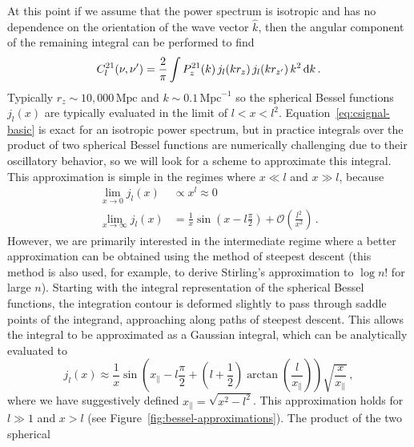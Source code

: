 \begin{bibunit}
\begin{subappendices}
At this point if we assume that the power spectrum is isotropic and has no dependence on the
orientation of the wave vector $\hat k$, then the angular component of the remaining integral can be
performed to find
\begin{equation}\label{eq:csignal-basic}
    C^{21}_l(\nu, \nu^\prime) =
        \frac{2}{\pi}
        \int
        P_z^{21}(k) \,
        j_l(k r_z) \,
        j_l(k r_{z^\prime}) \,
        k^2 \, {\textrm d} k\,.
\end{equation}
Typically $r_z\sim 10,000\,\text{Mpc}$ and $k\sim 0.1\,\text{Mpc}^{-1}$ so the spherical Bessel
functions $j_l(x)$ are typically evaluated in the limit of $l < x < l^2$.
Equation~\ref{eq:csignal-basic} is exact for an isotropic power spectrum, but in practice integrals
over the product of two spherical Bessel functions are numerically challenging due to their
oscillatory behavior, so we will look for a scheme to approximate this integral.  This approximation
is simple in the regimes where $x \ll l$ and $x \gg l$, because
\begin{align}
    \lim_{x\rightarrow 0} j_l(x) &\propto x^l \approx 0 \\
    \lim_{x\rightarrow\infty} j_l(x) &=
        \frac{1}{x} \sin\left(x - l\frac{\pi}{2}\right)
        + \mathcal{O}\left(\frac{l^2}{x^2}\right)
    \,.
\end{align}
However, we are primarily interested in the intermediate regime where a better approximation can be
obtained using the method of steepest descent (this method is also used, for example, to derive
Stirling's approximation to $\log n!$ for large $n$). Starting with the integral representation of
the spherical Bessel functions, the integration contour is deformed slightly to pass through saddle
points of the integrand, approaching along paths of steepest descent. This allows the integral to be
approximated as a Gaussian integral, which can be analytically evaluated to
\begin{equation}
    j_l(x) \approx
        \frac{1}{x}
        \sin\left(
            x_\parallel - l\frac{\pi}{2}
            + \left(l+\frac{1}{2}\right)\arctan\left(\frac{l}{x_\parallel}\right)
        \right)
        \sqrt{\frac{x}{x_\parallel}}
    \,,
\end{equation}
where we have suggestively defined $x_\parallel = \sqrt{x^2-l^2}$.  This approximation holds for
$l\gg 1$ and $x > l$ (see Figure~\ref{fig:bessel-approximations}). The product of the two spherical

\end{subappendices}
\end{bibunit}
